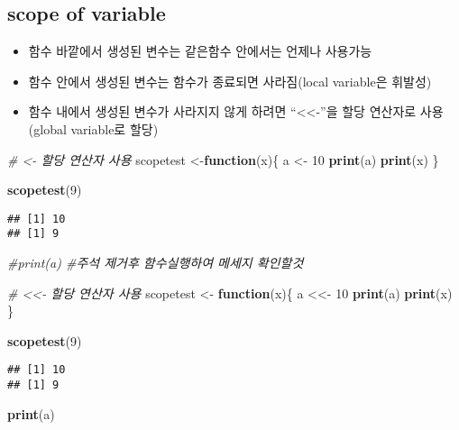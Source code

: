 \documentclass[
]{article}
\newenvironment{Shaded}{\begin{snugshade}}{\end{snugshade}}
\newcommand{\CommentTok}[1]{\textcolor[rgb]{0.56,0.35,0.01}{\textit{#1}}}
\newcommand{\ControlFlowTok}[1]{\textcolor[rgb]{0.13,0.29,0.53}{\textbf{#1}}}
\newcommand{\DecValTok}[1]{\textcolor[rgb]{0.00,0.00,0.81}{#1}}
\newcommand{\KeywordTok}[1]{\textcolor[rgb]{0.13,0.29,0.53}{\textbf{#1}}}
\newcommand{\NormalTok}[1]{#1}
\newcommand{\StringTok}[1]{\textcolor[rgb]{0.31,0.60,0.02}{#1}}
\providecommand{\tightlist}{%
  \setlength{\itemsep}{0pt}\setlength{\parskip}{0pt}}
\begin{document}
\hypertarget{scope-of-variable}{%
\subsection{scope of variable}\label{scope-of-variable}}

\begin{itemize}
\tightlist
\item
  함수 바깥에서 생성된 변수는 같은함수 안에서는 언제나 사용가능
\item
  함수 안에서 생성된 변수는 함수가 종료되면 사라짐(local variable은
  휘발성)
\item
  함수 내에서 생성된 변수가 사라지지 않게 하려면
  ``\textless\textless-''을 할당 연산자로 사용(global variable로 할당)
\end{itemize}

\begin{Shaded}
\begin{Highlighting}[]
\CommentTok{# <- 할당 연산자 사용}
\NormalTok{scopetest <-}\ControlFlowTok{function}\NormalTok{(x)\{}
\NormalTok{  a <-}\StringTok{ }\DecValTok{10}
  \KeywordTok{print}\NormalTok{(a)}
  \KeywordTok{print}\NormalTok{(x)}
\NormalTok{\}}

\KeywordTok{scopetest}\NormalTok{(}\DecValTok{9}\NormalTok{)}
\end{Highlighting}
\end{Shaded}

\begin{verbatim}
## [1] 10
## [1] 9
\end{verbatim}

\begin{Shaded}
\begin{Highlighting}[]
\CommentTok{#print(a) #주석 제거후 함수실행하여 메세지 확인할것}

\CommentTok{# <<- 할당 연산자 사용}
\NormalTok{scopetest <-}\StringTok{ }\ControlFlowTok{function}\NormalTok{(x)\{}
\NormalTok{  a <<-}\StringTok{ }\DecValTok{10}
  \KeywordTok{print}\NormalTok{(a)}
  \KeywordTok{print}\NormalTok{(x)}
\NormalTok{\}}

\KeywordTok{scopetest}\NormalTok{(}\DecValTok{9}\NormalTok{)}
\end{Highlighting}
\end{Shaded}

\begin{verbatim}
## [1] 10
## [1] 9
\end{verbatim}

\begin{Shaded}
\begin{Highlighting}[]
\KeywordTok{print}\NormalTok{(a)}
\end{Highlighting}
\end{Shaded}
\end{document}

